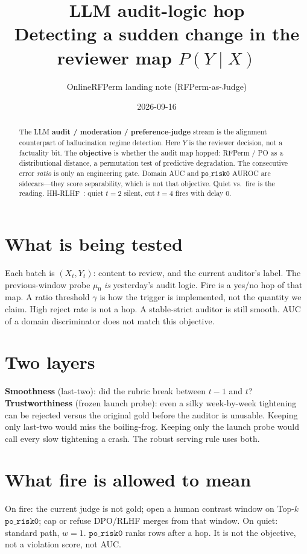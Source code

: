 \documentclass[11pt,a4paper]{article}
\title{\textbf{LLM audit-logic hop}\\[0.3em]
\large Detecting a sudden change in the reviewer map \(P(Y\mid X)\)}
\author{OnlineRFPerm landing note (RFPerm-as-Judge)}
\date{2026-09-16}
\begin{document}
\maketitle
\begin{abstract}
The LLM \textbf{audit / moderation / preference-judge} stream is the alignment counterpart of hallucination regime detection.
Here \(Y\) is the reviewer decision, not a factuality bit.
The \textbf{objective} is whether the audit map hopped: RFPerm / PO as a distributional distance, a permutation test of predictive degradation.
The consecutive error \emph{ratio} is only an engineering gate. Domain AUC and \(\texttt{po\_risk0}\) AUROC are sidecars---they score separability, which is not that objective.
Quiet vs.\ fire is the reading. HH-RLHF~\citep{bai2022hh-rlhf}: quiet \(t=2\) silent, cut \(t=4\) fires with delay 0.
\end{abstract}

\section{What is being tested}
Each batch is \((X_t,Y_t)\): content to review, and the current auditor's label.
The previous-window probe \(\mu_0\) \emph{is} yesterday's audit logic.
Fire is a yes/no hop of that map. A ratio threshold \(\gamma\) is how the trigger is implemented, not the quantity we claim.
High reject rate is not a hop. A stable-strict auditor is still smooth.
AUC of a domain discriminator does not match this objective.



\section{Two layers}
\textbf{Smoothness} (last-two): did the rubric break between \(t-1\) and \(t\)?
\textbf{Trustworthiness} (frozen launch probe): even a silky week-by-week tightening can be rejected versus the original gold before the auditor is unusable.
Keeping only last-two would miss the boiling-frog. Keeping only the launch probe would call every slow tightening a crash.
The robust serving rule uses both.

\section{What fire is allowed to mean}
On fire: the current judge is not gold; open a human contrast window on Top-\(k\) \(\texttt{po\_risk0}\); cap or refuse DPO/RLHF merges from that window.
On quiet: standard path, \(w=1\).
\(\texttt{po\_risk0}\) ranks rows after a hop. It is not the objective, not a violation score, not AUC.



\end{document}
